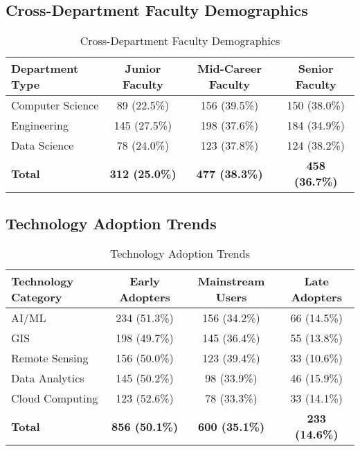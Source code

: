 \documentclass[12pt]{article}
\begin{document}
\subsection{Cross-Department Faculty Demographics}

\begin{table}[h]
\centering
\caption{Cross-Department Faculty Demographics}
\label{tab:faculty_demographics}
\begin{tabular}{lccc}
\toprule
\textbf{Department Type} & \textbf{Junior Faculty} & \textbf{Mid-Career Faculty} & \textbf{Senior Faculty} \\
\midrule
Computer Science & 89 (22.5\%) & 156 (39.5\%) & 150 (38.0\%) \\
Engineering & 145 (27.5\%) & 198 (37.6\%) & 184 (34.9\%) \\
Data Science & 78 (24.0\%) & 123 (37.8\%) & 124 (38.2\%) \\
\midrule
\textbf{Total} & \textbf{312 (25.0\%)} & \textbf{477 (38.3\%)} & \textbf{458 (36.7\%)} \\
\bottomrule
\end{tabular}
\end{table}

\subsection{Technology Adoption Trends}

\begin{table}[h]
\centering
\caption{Technology Adoption Trends}
\label{tab:tech_adoption_trends}
\begin{tabular}{lccc}
\toprule
\textbf{Technology Category} & \textbf{Early Adopters} & \textbf{Mainstream Users} & \textbf{Late Adopters} \\
\midrule
AI/ML & 234 (51.3\%) & 156 (34.2\%) & 66 (14.5\%) \\
GIS & 198 (49.7\%) & 145 (36.4\%) & 55 (13.8\%) \\
Remote Sensing & 156 (50.0\%) & 123 (39.4\%) & 33 (10.6\%) \\
Data Analytics & 145 (50.2\%) & 98 (33.9\%) & 46 (15.9\%) \\
Cloud Computing & 123 (52.6\%) & 78 (33.3\%) & 33 (14.1\%) \\
\midrule
\textbf{Total} & \textbf{856 (50.1\%)} & \textbf{600 (35.1\%)} & \textbf{233 (14.6\%)} \\
\bottomrule
\end{tabular}
\end{table}
\end{document}

